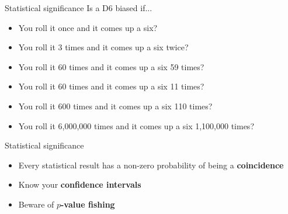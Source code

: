 \begin{frame}{Statistical significance}
	\pause Is a D6 biased if...
	\begin{itemize}
		\pause\item You roll it once and it comes up a six?
		\pause\item You roll it 3 times and it comes up a six twice?
		\pause\item You roll it 60 times and it comes up a six 59 times?
		\pause\item You roll it 60 times and it comes up a six 11 times?
		\pause\item You roll it 600 times and it comes up a six 110 times?
		\pause\item You roll it 6,000,000 times and it comes up a six 1,100,000 times?
	\end{itemize}
\end{frame}

\begin{frame}{Statistical significance}
	\begin{itemize}
		\pause\item Every statistical result has a non-zero probability of being a \textbf{coincidence}
		\pause\item Know your \textbf{confidence intervals}
		\pause\item Beware of \textbf{$p$-value fishing}
	\end{itemize}
\end{frame}

